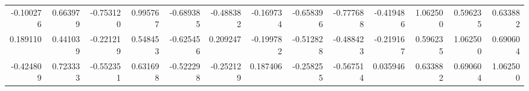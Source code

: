 \begin{tabular}{rrrrrrrrrrrrr}
 -0.100276 &  0.663979 &       -0.753120 &      0.995767 &     -0.689385 &      -0.488382 &     -0.169734 &  -0.658396 &    -0.777688 &    -0.419486 &      1.062500 &    0.596235 &       0.633882 \\
  0.189110 &  0.441039 &       -0.221219 &      0.548453 &     -0.625456 &       0.209247 &     -0.199782 &  -0.512828 &    -0.488423 &    -0.219167 &      0.596235 &    1.062500 &       0.690604 \\
 -0.424809 &  0.723333 &       -0.552351 &      0.631698 &     -0.522298 &      -0.252129 &      0.187406 &  -0.258255 &    -0.567514 &     0.035946 &      0.633882 &    0.690604 &       1.062500 \\
\bottomrule
\end{tabular}
